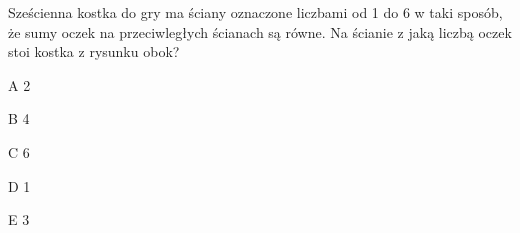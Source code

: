 \begin{tresc}
Sześcienna kostka do gry ma ściany oznaczone liczbami od 1 do 6 w taki sposób, że sumy oczek na przeciwległych ścianach są równe. Na ścianie z jaką liczbą oczek stoi kostka z rysunku obok?
\end{tresc}
\begin{wariant}{A} 2 \end{wariant}
\begin{wariant}{B} 4 \end{wariant}
\begin{wariant}{C} 6 \end{wariant}
\begin{wariant}{D} 1 \end{wariant}
\begin{wariant}{E} 3 \end{wariant}
